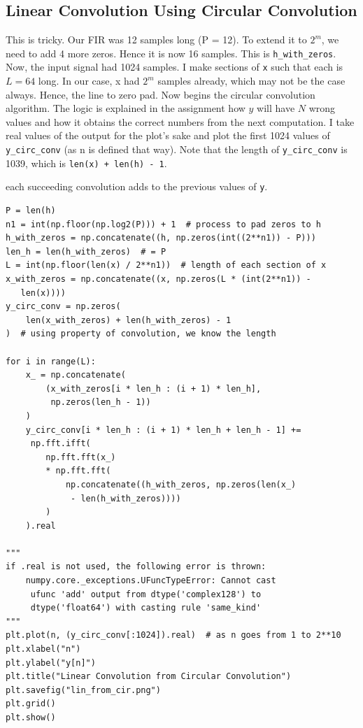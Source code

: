 \documentclass[11pt, a4paper]{article}
\begin{document}
\subsection{Linear Convolution Using Circular Convolution}
This is tricky. Our FIR was 12 samples long (P = 12). To extend it to $2^m$, we need to add 4 more zeros. Hence it is now 16 samples. This is \texttt{h\_with\_zeros}. Now, the input signal had 1024 samples. I make sections of \texttt{x} such that each is $L = 64$ long. In our case, x had $2^m$ samples already, which may not be the case always. Hence, the line to zero pad. Now begins the circular convolution algorithm. The logic is explained in the assignment how $y$ will have $N$ wrong values and how it obtains the correct numbers from the next computation. I take real values of the output for the plot's sake and plot the first 1024 values of \texttt{y\_circ\_conv} (as n is defined that way). Note that the length of \texttt{y\_circ\_conv} is 1039, which is \texttt{len(x) + len(h) - 1}.   

each succeeding convolution adds to the previous values of \texttt{y}.

\begin{verbatim}
P = len(h)
n1 = int(np.floor(np.log2(P))) + 1  # process to pad zeros to h
h_with_zeros = np.concatenate((h, np.zeros(int((2**n1)) - P)))
len_h = len(h_with_zeros)  # = P
L = int(np.floor(len(x) / 2**n1))  # length of each section of x
x_with_zeros = np.concatenate((x, np.zeros(L * (int(2**n1)) -
   len(x))))
y_circ_conv = np.zeros(
    len(x_with_zeros) + len(h_with_zeros) - 1
)  # using property of convolution, we know the length

for i in range(L):
    x_ = np.concatenate(
        (x_with_zeros[i * len_h : (i + 1) * len_h],
         np.zeros(len_h - 1))
    )
    y_circ_conv[i * len_h : (i + 1) * len_h + len_h - 1] +=
     np.fft.ifft(
        np.fft.fft(x_)
        * np.fft.fft(
            np.concatenate((h_with_zeros, np.zeros(len(x_)
             - len(h_with_zeros))))
        )
    ).real

"""
if .real is not used, the following error is thrown:
    numpy.core._exceptions.UFuncTypeError: Cannot cast
     ufunc 'add' output from dtype('complex128') to 
     dtype('float64') with casting rule 'same_kind' 
"""
plt.plot(n, (y_circ_conv[:1024]).real)  # as n goes from 1 to 2**10
plt.xlabel("n")
plt.ylabel("y[n]")
plt.title("Linear Convolution from Circular Convolution")
plt.savefig("lin_from_cir.png")
plt.grid()
plt.show()

\end{verbatim}
\end{document}
